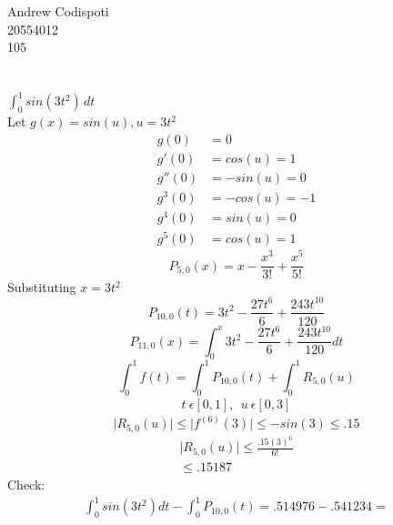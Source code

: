 \documentclass[12pt]{article}
\begin{document}
\noindent 
Andrew Codispoti\\
20554012\\
105
\section{}
$\int_0^1{sin(3t^2)}\,dt$\\
Let $g(x)=sin(u), u=3t^2$
\begin{align*}
g(0)&=0\\
g'(0)&=cos(u)=1\\
g''(0)&=-sin(u)=0\\
g^3(0)&=-cos(u)=-1\\
g^4(0)&=sin(u)=0\\
g^5(0)&=cos(u)=1
\end{align*}
\begin{equation}
P_{5,0}(x)=x-\frac{x^3}{3!}+\frac{x^5}{5!}
\end{equation}
Substituting $x=3t^2$
\begin{equation}
P_{10,0}(t)=3t^2-\frac{27t^6}{6}+\frac{243t^{10}}{120}
\end{equation} 
\begin{equation}
P_{11,0}(x)=\int_0^x{3t^2-\frac{27t^6}{6}+\frac{243t^{10}}{120}}dt
\end{equation}
\begin{equation}
\int_0^1f(t)=\int_0^1{P_{10,0}}(t)+\int_0^1{R_{5,0}(u)}
\end{equation}
\begin{align*}
t\ \epsilon[0,1],\ \  u\ \epsilon[0,3]
\end{align*}
\begin{equation}
\lvert R_{5,0}(u) \rvert\leq \lvert f^{(6)}(3)\rvert\leq -sin(3)\leq .15
\end{equation}
\begin{align}
\lvert R_{5,0}(u) \rvert \leq \frac{.15(3)^6}{6!}\\
\leq .15187
\end{align}
Check:
\begin{align}
\int_0^1sin(3t^2)dt-\int_0^1{P_{10,0}}(t)=.514976-.541234=
\end{align}
\section{}

\section{}
\section{}
\end{document}
